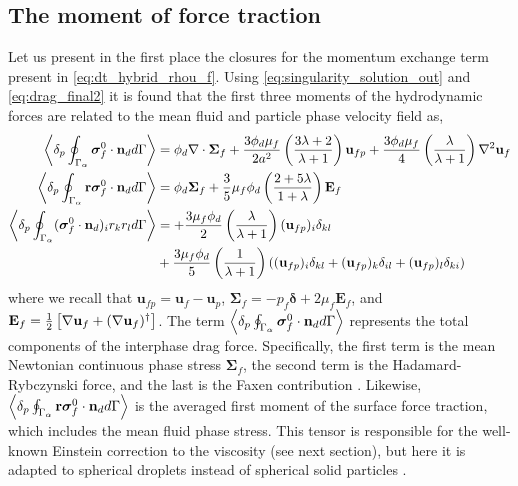 \subsection{The moment of force traction}

Let us present in the first place the closures for the momentum exchange term present in \ref{eq:dt_hybrid_rhou_f}. 
Using \ref{eq:singularity_solution_out} and \ref{eq:drag_final2} it is found that the first three moments of the hydrodynamic forces are related to the mean fluid and particle phase velocity field as, 
\begin{align}
    \label{eq:zeroth_mom}
    \pSavg{\bm{\sigma}_f^0\cdot \textbf{n}_d} &= 
    \phi_d \div\bm\Sigma_f
    + \frac{3\phi_d\mu_f}{2 a^2} 
    \left(\frac{3\lambda+2}{\lambda+1}\right) \textbf{u}_{f p} 
    + \frac{3\phi_d\mu_f}{4} \left(\frac{\lambda}{\lambda+1}\right)\grad^2\textbf{u}_f\\
    \label{eq:first_mom}
    \pavg{\intS{\textbf{r}\bm{\sigma}_f^0 \cdot \textbf{n}_d}} 
    &= 
    \phi_d \bm\Sigma_f + 
    \frac{3}{5}\mu_f \phi_d \left(\frac{2+5\lambda}{1+\lambda}\right)
    \textbf{E}_f
    \\
    \label{eq:second_mom}
        \pavg{\intS{(\bm{\sigma}_f^0 \cdot \textbf{n}_d)_ir_kr_l}} &=
        + \frac{3\mu_f\phi_d}{2}\left(\frac{\lambda}{\lambda+1}\right)(\textbf{u}_{fp})_i\delta_{kl}\\
        &+ \frac{3\mu_f\phi_d}{5}\left(\frac{1}{\lambda+1}\right)((\textbf{u}_{fp})_i\delta_{kl}+ (\textbf{u}_{fp})_k\delta_{il}+(\textbf{u}_{fp})_l\delta_{ki})\nonumber
\end{align}
where we recall that $\textbf{u}_{fp} = \textbf{u}_f - \textbf{u}_p$, $\bm\Sigma_f = -p_f\bm\delta +2 \mu_f \textbf{E}_f$, and $\textbf{E}_f = \frac{1}{2}\left[\mathbf{\nabla} \textbf{u}_f + (\mathbf{\nabla} \textbf{u}_f)^\dagger\right]$. 
The term $\left<\delta_p \oint_{\Gamma_{\alpha}} \bm{\sigma}_f^0 \cdot \textbf{n}_d d\Gamma\right>$ represents the total components of the interphase drag force.
Specifically, the first term is the mean Newtonian continuous phase stress $\bm\Sigma_f$, the second term is the Hadamard-Rybczynski force, and the last is the Faxen contribution \citep{kim2013microhydrodynamics}. 
Likewise, $\left<\delta_p \oint_{\Gamma_{\alpha}} \textbf{r}\bm{\sigma}_f^0 \cdot \textbf{n}_d d\Gamma\right>$ is the averaged first moment of the surface force traction, which includes the mean fluid phase stress. 
This tensor is responsible for the well-known Einstein correction to the viscosity (see next section), but here it is adapted to spherical droplets instead of spherical solid particles \citep{rallison1978note}. 
